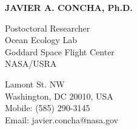 \documentclass[11pt]{res} %
\begin{document}
 
{\centering \Large \bf JAVIER A. CONCHA, Ph.D.\par} %
\vspace{0.3in}                                         
\begin{multicols}{2}
{\raggedright Postoctoral Researcher\\ Ocean Ecology Lab\\Goddard Space Flight Center \\ NASA/USRA\\}
{ Lamont St. NW\\Washington, DC 20010, USA\\Mobile: (585) 290-3145\\Email: javier.concha@nasa.gov\\}
\end{multicols}
\vspace{-0.4in} 
\hrulefill
\end{document}
